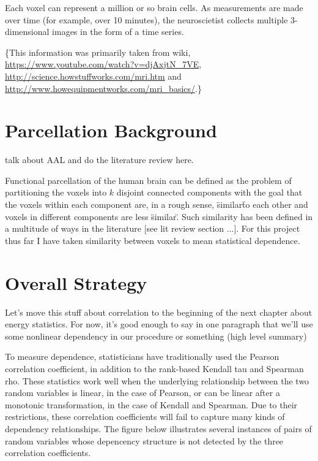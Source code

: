 {Each voxel can represent a million or so brain cells. As measurements
are made over time (for example, over 10 minutes), the neuroscietist
collects multiple 3-dimensional images in the form of a time series. 

\{This information was primarily taken from wiki,
\url{https://www.youtube.com/watch?v=djAxjtN\_7VE},
\url{http://science.howstuffworks.com/mri.htm} and
\url{http://www.howequipmentworks.com/mri\_basics/}.\}
}

\section{Parcellation Background}

{\color{red} talk about AAL and do the literature review here.}

Functional parcellation of the human brain can be defined as the problem
of partitioning the voxels into $k$ disjoint connected components with
the goal that the voxels within each component are, in a rough sense,
\"similar\" to each other and voxels in different components are less
\"similar\". Such similarity has been defined in a multitude of ways in
the literature [see lit review section ...]. For this project thus far I
have taken similarity between voxels to mean statistical dependence.

\section{Overall Strategy}
{\color{red}
Let's move this stuff about correlation to the beginning of the next
chapter about energy statistics. For now, it's good enough to say in one paragraph that we'll use some nonlinear dependency in our procedure or
something (high level summary)}

To measure dependence, statisticians have traditionally used the Pearson
correlation coefficient, in addition to the rank-based Kendall tau and
Spearman rho. These statistics work well when the underlying
relationship between the two random variables is linear, in the case of
Pearson, or can be linear after a monotonic transformation, in the case
of Kendall and Spearman. Due to their restrictions, these correlation
coefficients will fail to capture many kinds of dependency
relationships. The figure below illustrates several instances of pairs
of random variables whose depencency structure is not detected by the
three correlation coefficients.

